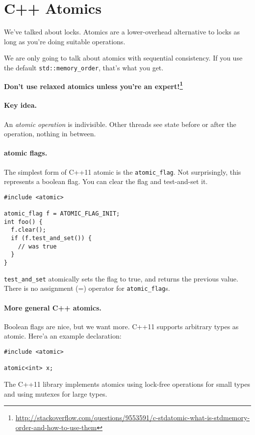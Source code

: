 




\section*{C++ Atomics}
We've talked about locks. Atomics are a lower-overhead alternative to
locks as long as you're doing suitable operations.

We are only going to talk about atomics with sequential consistency.
If you use
the default {\tt std::memory\_order}, that's what you get.

{\bf Don't use relaxed atomics unless you're an expert!\footnote{\url{http://stackoverflow.com/questions/9553591/c-stdatomic-what-is-stdmemory-order-and-how-to-use-them}}}

\paragraph{Key idea.}
An \emph{atomic operation} is indivisible.
Other threads see state before or after the operation,
nothing in between.

\paragraph{atomic flags.} The simplest form of C++11 atomic is the {\tt atomic\_flag}.
Not surprisingly, this represents a boolean flag. You can clear the flag and test-and-set it.

\begin{verbatim}
#include <atomic>

atomic_flag f = ATOMIC_FLAG_INIT;
int foo() {
  f.clear();
  if (f.test_and_set()) {
    // was true
  }
}
\end{verbatim}

{\tt test\_and\_set} atomically sets the flag to true, and returns the previous value. 
There is no assignment (=) operator for {\tt atomic\_flag}s.

\paragraph{More general C++ atomics.} Boolean flags are nice, but we want more.
C++11 supports arbitrary types as atomic. Here'a an example declaration:
\begin{verbatim}
#include <atomic>

atomic<int> x;
\end{verbatim}
The C++11 library implements atomics using lock-free operations for small types
and using mutexes for large types.

